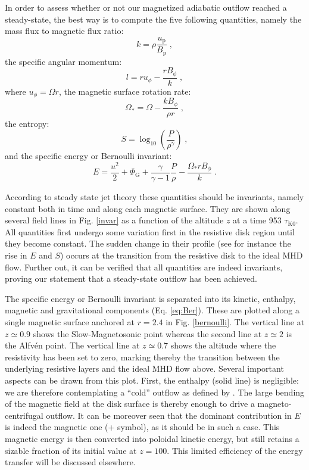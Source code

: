 \documentclass{aa}
\begin{document}
In order to assess whether or not our magnetized adiabatic outflow reached a steady-state, the best way is to compute the five following quantities, namely the mass flux to magnetic flux ratio:
\begin{equation}
k= \rho \frac{u_\mathrm{p}}{B_\mathrm{p}} \; ,
\end{equation}
the specific angular momentum:
\begin{equation}
l= r u_\phi - \frac{r B_\phi}{k} \; ,
\label{eq:l}
\end{equation}
where $u_\phi= \Omega r$, the magnetic surface rotation rate:
\begin{equation}
\Omega_* = \Omega - \frac{k B_\phi}{\rho r} \; ,
\end{equation}
the entropy:
\begin{equation}
S= \log_{10} \left( \frac{P}{\rho^{\gamma}} \right) \; ,
\end{equation}
and the specific energy or Bernoulli invariant:
\begin{equation}
E= \frac{u^2}{2} + \Phi_\mathrm{G} + \frac{\gamma}{\gamma -1} \frac{P}{\rho} - \frac{ \Omega_* r B_\phi}{k} \; .
\label{eq:Ber}
\end{equation}

According to steady state jet theory these quantities should be invariants, namely constant both in time and along each magnetic surface. They are shown along several field lines in Fig. \ref{invar}
as a function of the altitude $z$ at a time 953 $\tau_\mathrm{K0}$.  All quantities first undergo some variation first in the resistive disk region until they become constant. The sudden change in their
profile (see for instance the rise in $E$ and $S$) occurs at the transition from the resistive disk to the ideal MHD flow. Further out, it can be verified that all quantities are indeed invariants,
proving our statement that a steady-state outflow has been achieved.




The specific energy or Bernoulli invariant is separated into its kinetic, enthalpy, magnetic and gravitational components (Eq. \ref{eq:Ber}). These are plotted along a single magnetic surface anchored
at $r=2.4$ in Fig. \ref{bernoulli}.  The vertical line at $z\simeq 0.9$ shows the Slow-Magnetosonic point whereas the second line at $z\simeq 2$ is the Alfv\'en point. The vertical line at $z \simeq
0.7$ shows the altitude where the resistivity has been set to zero, marking thereby the transition between the underlying resistive layers and the ideal MHD flow above. Several important aspects can
be drawn from this plot. First, the enthalpy (solid line) is negligible: we are therefore contemplating a ``cold'' outflow as defined by \citet{1982MNRAS.199..883B}. The large bending of the magnetic
field at the disk surface is thereby enough to drive a magneto-centrifugal outflow. It can be moreover seen that the dominant contribution in $E$ is indeed the magnetic one (+ symbol), as it should be
in such a case. This magnetic energy is then converted into poloidal kinetic energy, but still retains a sizable fraction of its initial value at $z=100$. This limited efficiency of the energy
transfer will be discussed elsewhere.
\end{document}

